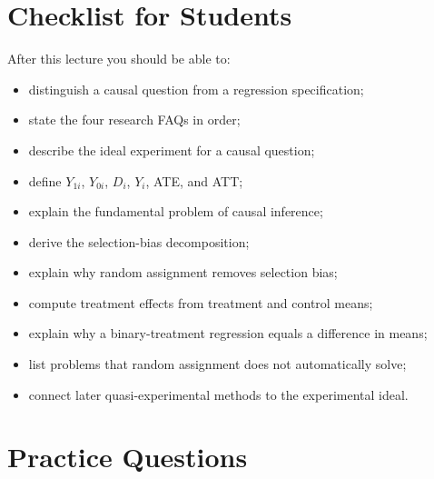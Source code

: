 \section{Checklist for Students}

After this lecture you should be able to:
\begin{itemize}
    \item distinguish a causal question from a regression specification;
    \item state the four research FAQs in order;
    \item describe the ideal experiment for a causal question;
    \item define \(Y_{1i}\), \(Y_{0i}\), \(D_i\), \(Y_i\), ATE, and ATT;
    \item explain the fundamental problem of causal inference;
    \item derive the selection-bias decomposition;
    \item explain why random assignment removes selection bias;
    \item compute treatment effects from treatment and control means;
    \item explain why a binary-treatment regression equals a difference in means;
    \item list problems that random assignment does not automatically solve;
    \item connect later quasi-experimental methods to the experimental ideal.
\end{itemize}

\section{Practice Questions}

